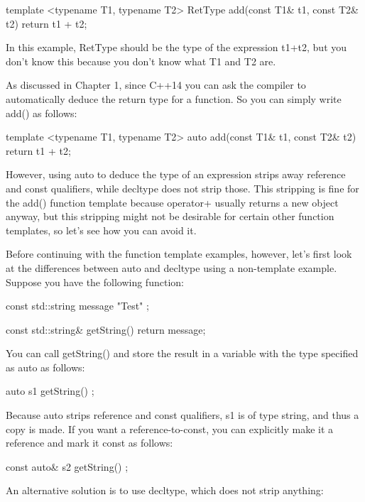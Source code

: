 \begin{cpp}
template <typename T1, typename T2>
RetType add(const T1& t1, const T2& t2) { return t1 + t2; }
\end{cpp}

In this example, RetType should be the type of the expression t1+t2, but you don’t know this because you don’t know what T1 and T2 are.

As discussed in Chapter 1, since C++14 you can ask the compiler to automatically deduce the return type for a function. So you can simply write add() as follows:

\begin{cpp}
template <typename T1, typename T2>
auto add(const T1& t1, const T2& t2) { return t1 + t2; }
\end{cpp}

However, using auto to deduce the type of an expression strips away reference and const qualifiers, while decltype does not strip those. This stripping is fine for the add() function template because operator+ usually returns a new object anyway, but this stripping might not be desirable for certain other function templates, so let’s see how you can avoid it.

Before continuing with the function template examples, however, let’s first look at the differences between auto and decltype using a non-template example. Suppose you have the following function:

\begin{cpp}
const std::string message { "Test" };

const std::string& getString() { return message; }
\end{cpp}

You can call getString() and store the result in a variable with the type specified as auto as follows:

\begin{cpp}
auto s1 { getString() };
\end{cpp}

Because auto strips reference and const qualifiers, s1 is of type string, and thus a copy is made. If you want a reference-to-const, you can explicitly make it a reference and mark it const as follows:

\begin{cpp}
const auto& s2 { getString() };
\end{cpp}

An alternative solution is to use decltype, which does not strip anything:

